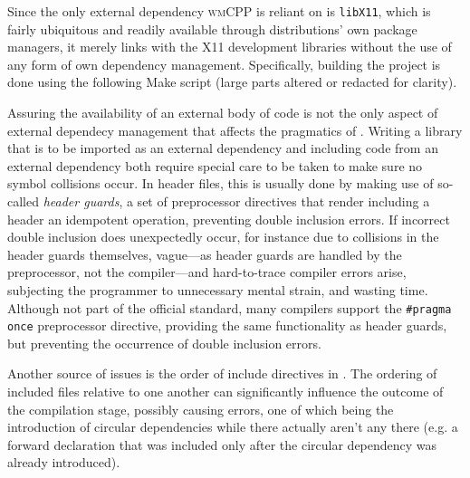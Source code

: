 Since   the  only   external  dependency   \textsc{wmCPP}  is   reliant  on   is
\texttt{libX11},  which  is  fairly  ubiquitous and  readily  available  through
distributions' own  package managers, it  merely links with the  X11 development
libraries  without   the  use  of   any  form  of  own   dependency  management.
Specifically, building  the project  is done  using the  following \textup{Make}
script (large parts altered or redacted for clarity).


Assuring the availability of an external body  of code is not the only aspect of
external dependecy  management that  affects the pragmatics  of \cpp.  Writing a
library that is to be imported as an external dependency and including code from
an external  dependency both require  special care to be  taken to make  sure no
symbol collisions occur. In header files, this  is usually done by making use of
so-called \textit{header guards},  a set of preprocessor  directives that render
including a header an idempotent  operation, preventing double inclusion errors.
If  incorrect double  inclusion does  unexpectedly  occur, for  instance due  to
collisions in the header guards themselves, vague---as header guards are handled
by the preprocessor, not the compiler---and hard-to-trace compiler errors arise,
subjecting  the  programmer to  unnecessary  mental  strain, and  wasting  time.
Although not  part of  the official  standard\cite{cppstd}, many  \cpp compilers
support the \texttt{#pragma once} preprocessor directive, providing the
same functionality  as header  guards, but preventing  the occurrence  of double
inclusion errors.

Another  source of  issues  is the  order  of include  directives  in \cpp.  The
ordering of included  files relative to one another  can significantly influence
the outcome  of the  compilation stage,  possibly causing  errors, one  of which
being the introduction of circular  dependencies while there actually aren't any
there (e.g.  a forward  declaration that  was included  only after  the circular
dependency was already introduced).\\

